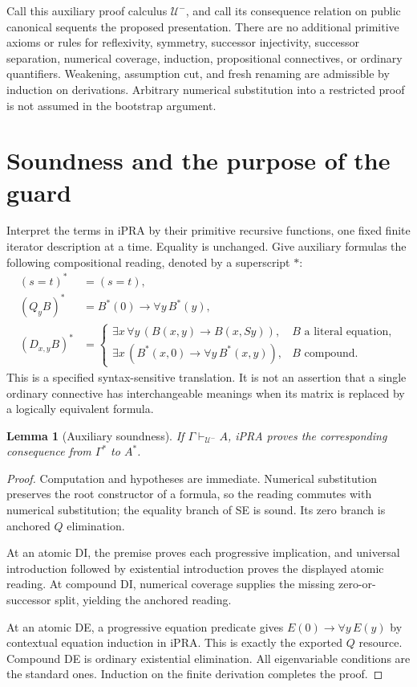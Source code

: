 \documentclass[11pt,letterpaper]{article}
\newtheorem{lemma}[theorem]{Lemma}
\theoremstyle{definition}
\newcommand{\UU}{\mathcal U^{-}}
\begin{document}
Call this auxiliary proof calculus $\UU$, and call its consequence relation
on public canonical sequents the proposed presentation. There are no
additional primitive axioms or rules for reflexivity, symmetry, successor
injectivity, successor separation, numerical coverage, induction,
propositional connectives, or ordinary quantifiers. Weakening, assumption
cut, and fresh renaming are admissible by induction on derivations. Arbitrary
numerical substitution into a restricted proof is not assumed in the
bootstrap argument.

\section{Soundness and the purpose of the guard}
\label{sec:sound}

Interpret the terms in iPRA by their primitive recursive functions, one fixed
finite iterator description at a time. Equality is unchanged. Give auxiliary
formulas the following compositional reading, denoted by a superscript $*$:
\begin{align*}
 (s=t)^*&=(s=t),\\
 (Q_yB)^*&=B^*(0)\to\forall y\,B^*(y),\\
 (D_{x,y}B)^*&=
 \begin{cases}
  \exists x\,\forall y\,(B(x,y)\to B(x,Sy)),&B\text{ a literal equation},\\
  \exists x\,(B^*(x,0)\to\forall y\,B^*(x,y)),&B\text{ compound}.
 \end{cases}
\end{align*}
This is a specified syntax-sensitive translation. It is not an assertion
that a single ordinary connective has interchangeable meanings when its
matrix is replaced by a logically equivalent formula.

\begin{lemma}[Auxiliary soundness]
If $\Gamma\vdash_{\UU}A$, iPRA proves the corresponding consequence
from $\Gamma^*$ to $A^*$.
\end{lemma}
\begin{proof}
Computation and hypotheses are immediate. Numerical substitution preserves
the root constructor of a formula, so the reading commutes with numerical
substitution; the equality branch of SE is sound. Its zero branch is
anchored $Q$ elimination.

At an atomic DI, the premise proves each progressive implication, and
universal introduction followed by existential introduction proves the
displayed atomic reading. At compound DI, numerical coverage supplies the
missing zero-or-successor split, yielding the anchored reading.

At an atomic DE, a progressive equation predicate gives
$E(0)\to\forall y\,E(y)$ by contextual equation induction in iPRA.
This is exactly the exported $Q$ resource. Compound DE is ordinary
existential elimination. All eigenvariable conditions are the standard
ones. Induction on the finite derivation completes the proof.
\end{proof}
\end{document}

